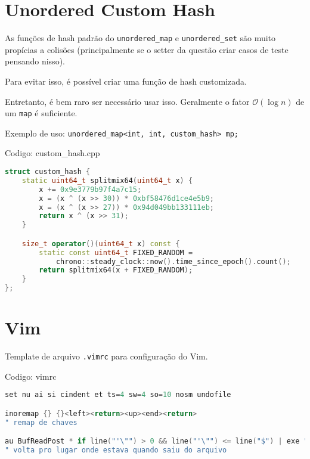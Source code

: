 \documentclass[10pt, a4paper, oneside]{book}
\begin{document}
\section{Unordered Custom Hash}


As funções de hash padrão do \texttt{unordered\_map} e \texttt{unordered\_set} são muito propícias a colisões (principalmente se o setter da questão criar casos de teste pensando nisso).

Para evitar isso, é possível criar uma função de hash customizada.



Entretanto, é bem raro ser necessário usar isso. Geralmente o fator $\mathcal{O}(\log n)$ de um \texttt{map} é suficiente.



Exemplo de uso: \texttt{unordered\_map<int, int, custom\_hash> mp;}
\hfill

Codigo: custom\_hash.cpp

\begin{lstlisting}[language=C++]
struct custom_hash {
    static uint64_t splitmix64(uint64_t x) {
        x += 0x9e3779b97f4a7c15;
        x = (x ^ (x >> 30)) * 0xbf58476d1ce4e5b9;
        x = (x ^ (x >> 27)) * 0x94d049bb133111eb;
        return x ^ (x >> 31);
    }

    size_t operator()(uint64_t x) const {
        static const uint64_t FIXED_RANDOM =
            chrono::steady_clock::now().time_since_epoch().count();
        return splitmix64(x + FIXED_RANDOM);
    }
};\end{lstlisting}
\hfill

\section{Vim}


Template de arquivo \texttt{.vimrc} para configuração do Vim.

\hfill

Codigo: vimrc

\begin{lstlisting}[language=C++]
set nu ai si cindent et ts=4 sw=4 so=10 nosm undofile

inoremap {} {}<left><return><up><end><return>
" remap de chaves

au BufReadPost * if line("'\"") > 0 && line("'\"") <= line("$") | exe "normal! g'\"" | endif
" volta pro lugar onde estava quando saiu do arquivo
\end{lstlisting}
\hfill
\end{document}
